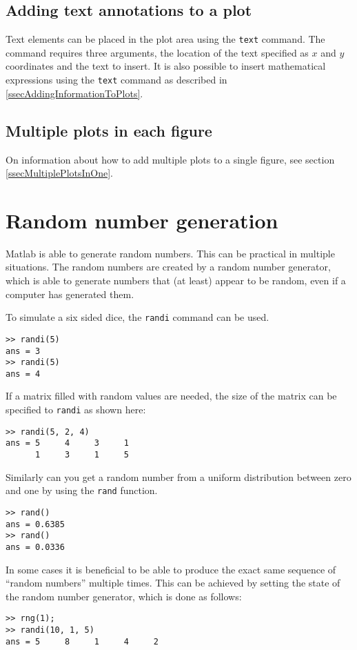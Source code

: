 \documentclass[fleqn, 12pt,a4paper]{article}
\newcounter{ex}
\numberwithin{ex}{section}
\begin{document}
\subsection{Adding text annotations to a plot}

Text elements can be placed in the plot area
using the \verb!text! command.
The command requires three arguments, the location of the 
text specified as $x$ and $y$ coordinates and the 
text to insert.
It is also possible to insert mathematical expressions
using the \verb!text! command as described in 
\ref{ssecAddingInformationToPlots}.


\subsection{Multiple plots in each figure}

On information about how to add multiple
plots to a single figure, see section 
\ref{ssecMultiplePlotsInOne}.



\section{Random number generation}

Matlab is able to generate random numbers.
This can be practical in multiple situations.
The random numbers are created by a random number 
generator, which is able to generate numbers that 
(at least) appear to be random, even if a computer 
has generated them.

To simulate a six sided dice, the \verb!randi! command
can be used.
\begin{lstlisting}
>> randi(5)
ans = 3
>> randi(5)
ans = 4
\end{lstlisting}
If a matrix filled with random values are needed, the size
of the matrix can be specified to \verb!randi! as shown here:
\begin{lstlisting}
>> randi(5, 2, 4)
ans = 5     4     3     1
      1     3     1     5
\end{lstlisting}

Similarly can you get a random number from a uniform 
distribution between zero and one by using the \verb!rand! 
function.
\begin{lstlisting}
>> rand()
ans = 0.6385
>> rand()
ans = 0.0336
\end{lstlisting}
In some cases it is beneficial to be able to produce the exact
same sequence of ``random numbers'' multiple times.
This can be achieved by setting the state of the random number 
generator, which is done as follows:
\begin{lstlisting}
>> rng(1); 
>> randi(10, 1, 5)
ans = 5     8     1     4     2
\end{lstlisting}
\end{document}
